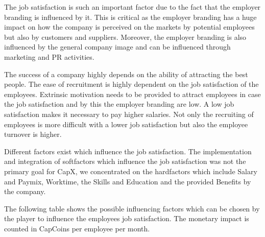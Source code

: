 The job satisfaction is such an important factor due to the fact that the employer branding is influenced by it. This is critical as the employer branding has a huge impact on how the company is perceived on the markets by potential employees but also by customers and suppliers. Moreover, the employer branding is also influenced by the general company image and can be influenced through marketing and PR activities. 

The success of a company highly depends on the ability of attracting the best people. The ease of recruitment is highly dependent on the job satisfaction of the employees. Extrinsic motivation needs to be provided to attract employees in case the job satisfaction and by this the employer branding are low. A low job satisfaction makes it necessary to pay higher salaries. Not only the recruiting of employees is more difficult with a lower job satisfaction but also the employee turnover is higher. \cite{frederiksen2016}

Different factors exist which influence the job satisfaction. \cite{Kapur} The implementation and integration of softfactors which influence the job satisfaction was not the primary goal for CapX, we concentrated on the hardfactors which include Salary and Paymix, Worktime, the Skills and Education and the provided Benefits by the company. 

The following table shows the possible influencing factors which can be chosen by the player to influence the employees job satisfaction. The monetary impact is counted in CapCoins per employee per month. 

